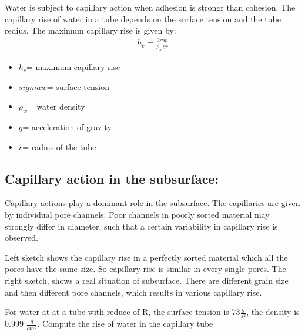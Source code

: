 \documentclass[letterpaper,10pt,english]{sphinxmanual}
\let\sphinxpxdimen\pdfpxdimen\else\newdimen\sphinxpxdimen
\begin{document}
Water is subject to capillary action when adhesion is strongr than cohesion. The capillary rise of water in a tube depends on the surface tension and the tube redius. The maximum capillary rise is given by:
\begin{equation*}
\begin{split}{h_{c}}=\frac{2\sigma{w}}{\rho_{w}{g}{r}}\end{split}
\end{equation*}\begin{itemize}
\item {} 
\({h_{c}}\)= maximum capillary rise

\item {} 
\(sigma{w}\)= surface tension

\item {} 
\(\rho_{w}\)= water density

\item {} 
\({g}\)= acceleration of gravity

\item {} 
\({r}\)= radius of the tube

\end{itemize}


\subsection{Capillary action in the subsurface:}
\label{\detokenize{contents/flow/12_subsurface_structure:capillary-action-in-the-subsurface}}
Capillary actions play a dominant role in the subsurface. The capillaries are given by individual pore channels. Poor channels in poorly sorted material may strongly differ in diameter, such that a certain variability in capillary rise is observed.

\noindent{\hspace*{\fill}\sphinxincludegraphics[height=400\sphinxpxdimen]{{L02_fig14}.png}\hspace*{\fill}}

Left sketch shows the capillary rise in a perfectly sorted material which all the pores have the same size. So capillary rise is similar in every single pores. The right sketch, shows a real situation of subsurface. There are different grain size and then different pore channels, which results in various capillary rise.

For water at at a tube with reduce of R, the surface tension is 73\(\frac{g}{s^2}\), the density is 0.999 \(\frac{g}{cm^3}\). Compute the rise of water in the capillary tube
\end{document}
